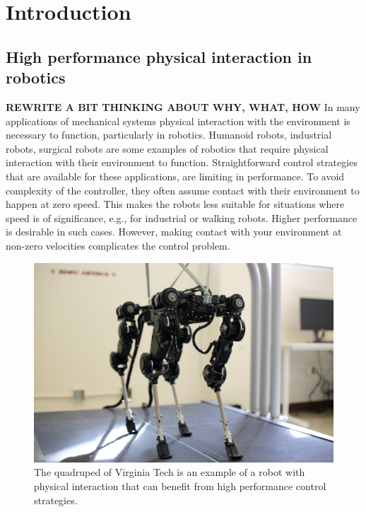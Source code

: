 \documentclass[../DC2017114Bouma.tex]{subfiles}
\begin{document}
\graphicspath{{01_Introduction/img/}}
\renewcommand{\chaptermark}[1]{\markboth{\thechapter.\ #1}{}}
\renewcommand{\sectionmark}[1]{\markright{#1}{}}
\cleartooddpage
\pagestyle{fancyreport}

\chapter{Introduction}
\section{High performance physical interaction in robotics}
\textbf{REWRITE A BIT THINKING ABOUT WHY, WHAT, HOW}
In many applications of mechanical systems physical interaction with the environment is necessary to function, particularly in robotics. Humanoid robots, industrial robots, surgical robots are some examples of robotics that require physical interaction with their environment to function. Straightforward control strategies that are available for these applications, are limiting in performance. To avoid complexity of the controller, they often assume contact with their environment to happen at zero speed. This makes the robots less suitable for situations where speed is of significance, e.g., for industrial or walking robots. Higher performance is desirable in such cases. However, making contact with your environment at non-zero velocities complicates the control problem.

\begin{figure}[H]
\centering
\includegraphics[width=.5\textwidth]{quadruped.jpg}\caption{The quadruped of Virginia Tech is an example of a robot with physical interaction that can benefit from high performance control strategies.}\label{fig:quadrupedVT}
\end{figure}
\end{document}
